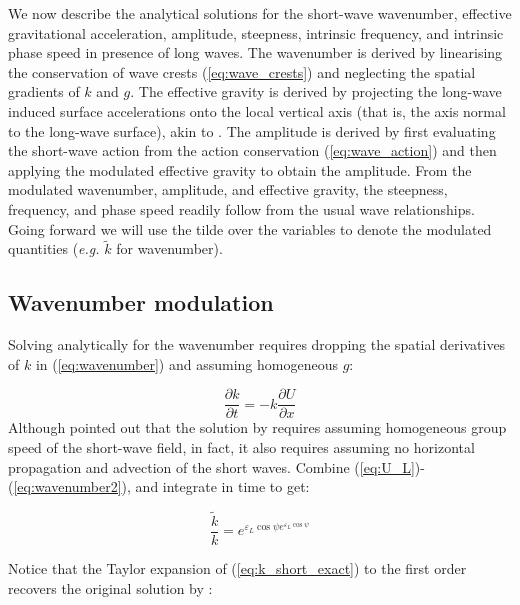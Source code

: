 \documentclass[lineno]{jfm}
\begin{document}
We now describe the analytical solutions for the short-wave wavenumber,
effective gravitational acceleration, amplitude, steepness, intrinsic frequency,
and intrinsic phase speed in presence of long waves.
The wavenumber is derived by linearising the conservation of wave crests
(\ref{eq:wave_crests}) and neglecting the spatial gradients of $k$ and $g$.
The effective gravity is derived by projecting the long-wave induced surface
accelerations onto the local vertical axis (that is, the axis normal to the
long-wave surface), akin to \citet{zhang1990evolution}.
The amplitude is derived by first evaluating the short-wave action from the
action conservation (\ref{eq:wave_action}) and then applying the modulated
effective gravity to obtain the amplitude.
From the modulated wavenumber, amplitude, and effective gravity, the steepness,
frequency, and phase speed readily follow from the usual wave relationships.
Going forward we will use the tilde over the variables to denote the modulated
quantities (\textit{e.g.} $\widetilde{k}$ for wavenumber).

\subsection{Wavenumber modulation}
\label{subsection:wavenumber_modulation}

Solving analytically for the wavenumber requires dropping the spatial derivatives
of $k$ in (\ref{eq:wavenumber}) and assuming homogeneous $g$:

\begin{equation}
\label{eq:wavenumber2}
\dfrac{\partial k}{\partial t}
= - k \dfrac{\partial U}{\partial x}
\end{equation}
Although \citet{peureux2021unsteady} pointed out that the solution by
\citet{longuet1960changes} requires assuming homogeneous group speed of the
short-wave field, in fact, it also requires assuming no horizontal propagation
and advection of the short waves.
Combine (\ref{eq:U_L})-(\ref{eq:wavenumber2}), and integrate in time to get:

\begin{equation}
\label{eq:k_short_exact}
\frac{\widetilde{k}}{k} = e^{\varepsilon_L \cos{\psi} e^{\varepsilon_L \cos{\psi}}}
\end{equation}

Notice that the Taylor expansion of (\ref{eq:k_short_exact}) to the first order
recovers the original solution by \citet{longuet1960changes}:
\end{document}
